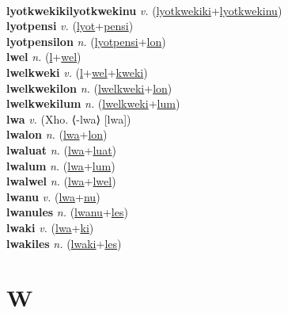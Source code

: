  \label{lyotkwekiki} \\
\textbf{lyotkwekikilyotkwekinu} \textit{v.} (\hyperref[lyotkwekiki]{lyotkwekiki}+\hyperref[lyotkwekinu]{lyotkwekinu})
 \label{lyotkwekikilyotkwekinu} \\
\textbf{lyotpensi} \textit{v.} (\hyperref[lyot]{lyot}+\hyperref[pensi]{pensi})
 \label{lyotpensi} \\
\textbf{lyotpensilon} \textit{n.} (\hyperref[lyotpensi]{lyotpensi}+\hyperref[lon]{lon})
 \label{lyotpensilon} \\
\textbf{lwel} \textit{n.} (\hyperref[l]{l}+\hyperref[wel]{wel})
 \label{lwel} \\
\textbf{lwelkweki} \textit{v.} (\hyperref[l]{l}+\hyperref[wel]{wel}+\hyperref[kweki]{kweki})
 \label{lwelkweki} \\
\textbf{lwelkwekilon} \textit{n.} (\hyperref[lwelkweki]{lwelkweki}+\hyperref[lon]{lon})
 \label{lwelkwekilon} \\
\textbf{lwelkwekilum} \textit{n.} (\hyperref[lwelkweki]{lwelkweki}+\hyperref[lum]{lum})
 \label{lwelkwekilum} \\
\textbf{lwa} \textit{v.} (Xho. ⟨-lwa⟩ [lwa])
 \label{lwa} \\
\textbf{lwalon} \textit{n.} (\hyperref[lwa]{lwa}+\hyperref[lon]{lon})
 \label{lwalon} \\
\textbf{lwaluat} \textit{n.} (\hyperref[lwa]{lwa}+\hyperref[luat]{luat})
 \label{lwaluat} \\
\textbf{lwalum} \textit{n.} (\hyperref[lwa]{lwa}+\hyperref[lum]{lum})
 \label{lwalum} \\
\textbf{lwalwel} \textit{n.} (\hyperref[lwa]{lwa}+\hyperref[lwel]{lwel})
 \label{lwalwel} \\
\textbf{lwanu} \textit{v.} (\hyperref[lwa]{lwa}+\hyperref[nu]{nu})
 \label{lwanu} \\
\textbf{lwanules} \textit{n.} (\hyperref[lwanu]{lwanu}+\hyperref[les]{les})
 \label{lwanules} \\
\textbf{lwaki} \textit{v.} (\hyperref[lwa]{lwa}+\hyperref[ki]{ki})
 \label{lwaki} \\
\textbf{lwakiles} \textit{n.} (\hyperref[lwaki]{lwaki}+\hyperref[les]{les})
 \label{lwakiles} 

\section{W}

